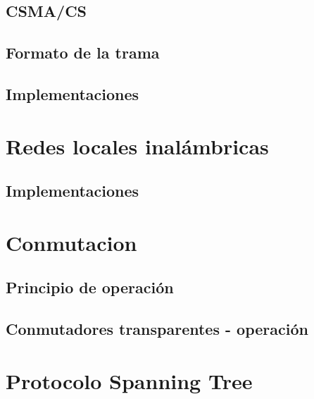 \documentclass[
]{book}
\begin{document}
\hypertarget{csmacs}{%
\subsection{CSMA/CS}\label{csmacs}}

\hypertarget{formato-de-la-trama}{%
\subsection{Formato de la trama}\label{formato-de-la-trama}}

\hypertarget{implementaciones}{%
\subsection{Implementaciones}\label{implementaciones}}

\hypertarget{redes-locales-inaluxe1mbricas}{%
\section{Redes locales inalámbricas}\label{redes-locales-inaluxe1mbricas}}

\hypertarget{implementaciones-1}{%
\subsection{Implementaciones}\label{implementaciones-1}}

\hypertarget{conmutacion}{%
\section{Conmutacion}\label{conmutacion}}

\hypertarget{principio-de-operaciuxf3n}{%
\subsection{Principio de operación}\label{principio-de-operaciuxf3n}}

\hypertarget{conmutadores-transparentes---operaciuxf3n}{%
\subsection{Conmutadores transparentes - operación}\label{conmutadores-transparentes---operaciuxf3n}}

\hypertarget{protocolo-spanning-tree}{%
\section{Protocolo Spanning Tree}\label{protocolo-spanning-tree}}
\end{document}
